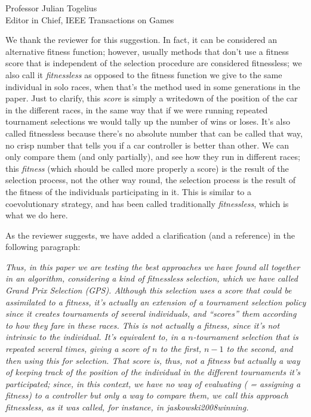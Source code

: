 \documentclass[10pt]{letter} %
\begin{document}
\begin{letter}{Professor Julian Togelius \\ Editor in Chief, IEEE Transactions on Games}
\begin{enumerate}
We thank the reviewer for this suggestion. In fact, it can be
considered an alternative fitness function; however, usually methods
that don't use a fitness score that is independent of the selection
procedure are considered fitnessless; we also call it {\em
  fitnessless} as opposed to the fitness function we give to the same
individual in solo races, when that's the method used in some
generations in the paper. Just to clarify, this {\em score} is simply
a writedown of the position of the car in the different races, in the
same way that if we were running repeated tournament selections we
would tally up the number of wins or loses. It's also called
fitnessless because there's no absolute number that can be called that
way, no crisp number that tells you if a car controller is better than
other. We can only compare them (and only partially), and see how they
run in different races; this {\em fitness} (which should be called
more properly a score) is the result of the selection process, not the
other way round, the selection process is the result of the fitness of
the individuals participating in it. This is similar to a
coevolutionary strategy, and has been called traditionally {\em
  fitnessless}, which is what we do here.

As the reviewer suggests, we have added a clarification (and a
reference) in the following paragraph:

{\em Thus, in this paper we are testing the best approaches we have
  found all together in an algorithm, considering a kind of
  fitnessless selection, which we have called \textit{Grand Prix
    Selection} (GPS). Although this selection uses a score that could
  be assimilated to a fitness, it's actually an extension of a
  tournament selection policy since it creates tournaments of several
  individuals, and ``scores'' them according to how they fare in these
  races. This is not actually a fitness, since it's not intrinsic to
  the individual. It's equivalent to, in a $n$-tournament selection
  that is repeated several times, giving a score of $n$ to the first,
  $n-1$ to the second, and then using this for selection. That score
  is, thus, not a fitness but actually a way of keeping track of the
  position of the individual in the different tournaments it's
  participated; since, in this context, we have no way of evaluating (
  = assigning a fitness) to a controller but only a way to compare
  them, we call this approach {\em fitnessless}, as it was called, for
  instance, in {\sc jaskowski2008winning}.}


\end{enumerate}
\end{letter}
\end{document}
